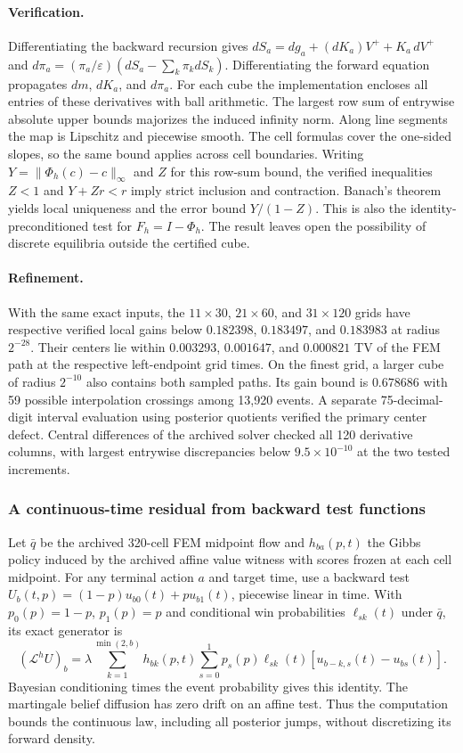 \paragraph{Verification.}
Differentiating the backward recursion gives
$dS_a=dg_a+(dK_a)V^++K_a\,dV^+$ and
$d\pi_a=(\pi_a/\varepsilon)(dS_a-\sum_k\pi_k dS_k)$.
Differentiating the forward equation propagates $dm$, $dK_a$, and
$d\pi_a$. For each cube the implementation encloses all entries of these
derivatives with ball arithmetic. The largest row sum of entrywise absolute
upper bounds majorizes the induced infinity norm. Along line segments the
map is Lipschitz and piecewise smooth. The cell formulas cover the
one-sided slopes, so the same bound applies across cell boundaries.
Writing $Y=\|\Phi_h(c)-c\|_\infty$ and $Z$ for this row-sum bound, the
verified inequalities $Z<1$ and $Y+Zr<r$ imply strict inclusion and
contraction. Banach's theorem yields local uniqueness and the error
bound $Y/(1-Z)$. This is also the identity-preconditioned test for
$F_h=I-\Phi_h$. The result leaves open the possibility of discrete
equilibria outside the certified cube.

\paragraph{Refinement.}
With the same exact inputs, the $11\times30$, $21\times60$, and
$31\times120$ grids have respective verified local gains below $0.182398$,
$0.183497$, and $0.183983$ at radius $2^{-28}$. Their centers lie within
$0.003293$, $0.001647$, and $0.000821$ TV of the FEM path at the
respective left-endpoint grid times. On the finest grid, a larger cube of radius
$2^{-10}$ also contains both sampled paths. Its gain bound is $0.678686$
with 59 possible interpolation crossings among 13,920 events.
A separate 75-decimal-digit interval
evaluation using posterior quotients verified the primary center defect.
Central differences of the archived solver checked all 120 derivative
columns, with largest entrywise discrepancies below $9.5\times10^{-10}$
at the two tested increments.

\CGpage
\subsubsection{A continuous-time residual from backward test functions}
Let $\bar q$ be the archived 320-cell FEM midpoint flow and $h_{ba}(p,t)$
the Gibbs policy induced by the archived affine value witness with scores
frozen at each cell midpoint. For any terminal action $a$ and target time,
use a backward test $U_b(t,p)=(1-p)u_{b0}(t)+pu_{b1}(t)$, piecewise
linear in time. With $p_0(p)=1-p$, $p_1(p)=p$ and conditional win
probabilities $\ell_{sk}(t)$ under $\bar q$, its exact generator is
\[
 (\mathcal L^h U)_b
 =\lambda\sum_{k=1}^{\min(2,b)} h_{bk}(p,t)
     \sum_{s=0}^1 p_s(p)\ell_{sk}(t)
       [u_{b-k,s}(t)-u_{bs}(t)].
\]
Bayesian conditioning times the event probability gives this identity.
The martingale belief diffusion has zero drift on an affine test.
Thus the computation bounds the continuous law, including all posterior
jumps, without discretizing its forward density.

